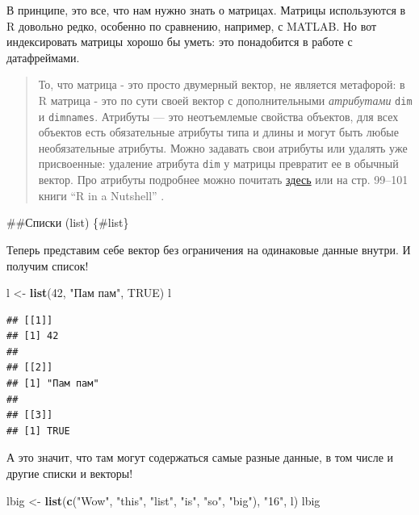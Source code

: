 \documentclass[]{book}
\newenvironment{Shaded}{\begin{snugshade}}{\end{snugshade}}
\newcommand{\DecValTok}[1]{\textcolor[rgb]{0.00,0.00,0.81}{#1}}
\newcommand{\KeywordTok}[1]{\textcolor[rgb]{0.13,0.29,0.53}{\textbf{#1}}}
\newcommand{\NormalTok}[1]{#1}
\newcommand{\OtherTok}[1]{\textcolor[rgb]{0.56,0.35,0.01}{#1}}
\newcommand{\StringTok}[1]{\textcolor[rgb]{0.31,0.60,0.02}{#1}}
\begin{document}
В принципе, это все, что нам нужно знать о матрицах. Матрицы используются в R довольно редко, особенно по сравнению, например, с MATLAB. Но вот индексировать матрицы хорошо бы уметь: это понадобится в работе с датафреймами.

\begin{quote}
То, что матрица - это просто двумерный вектор, не является метафорой: в R матрица - это по сути своей вектор с дополнительными \emph{атрибутами} \texttt{dim} и \texttt{dimnames}. Атрибуты --- это неотъемлемые свойства объектов, для всех объектов есть обязательные атрибуты типа и длины и могут быть любые необязательные атрибуты. Можно задавать свои атрибуты или удалять уже присвоенные: удаление атрибута \texttt{dim} у матрицы превратит ее в обычный вектор. Про атрибуты подробнее можно почитать \href{https://perso.esiee.fr/~courivad/R/06-objects.html}{здесь} или на стр. 99--101 книги ``R in a Nutshell'' \citep{adler2010r}.
\end{quote}

\#\#Списки (list) \{\#list\}

Теперь представим себе вектор без ограничения на одинаковые данные внутри. И получим список!

\begin{Shaded}
\begin{Highlighting}[]
\NormalTok{l <-}\StringTok{ }\KeywordTok{list}\NormalTok{(}\DecValTok{42}\NormalTok{, }\StringTok{"Пам пам"}\NormalTok{, }\OtherTok{TRUE}\NormalTok{)}
\NormalTok{l}
\end{Highlighting}
\end{Shaded}

\begin{verbatim}
## [[1]]
## [1] 42
## 
## [[2]]
## [1] "Пам пам"
## 
## [[3]]
## [1] TRUE
\end{verbatim}

А это значит, что там могут содержаться самые разные данные, в том числе и другие списки и векторы!

\begin{Shaded}
\begin{Highlighting}[]
\NormalTok{lbig <-}\StringTok{ }\KeywordTok{list}\NormalTok{(}\KeywordTok{c}\NormalTok{(}\StringTok{"Wow"}\NormalTok{, }\StringTok{"this"}\NormalTok{, }\StringTok{"list"}\NormalTok{, }\StringTok{"is"}\NormalTok{, }\StringTok{"so"}\NormalTok{, }\StringTok{"big"}\NormalTok{), }\StringTok{"16"}\NormalTok{, l)}
\NormalTok{lbig}
\end{Highlighting}
\end{Shaded}
\end{document}
